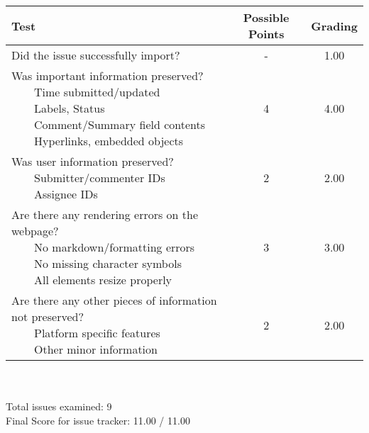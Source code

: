 \documentclass{article}
\newcommand{\tabitem}{~~\llap{\textbullet}~~}
\begin{document}
\begin{adjustbox}{center}
	\renewcommand{\arraystretch}{1.5}
	\begin{tabular}{ p{6cm} | c | c }
		Test & Possible Points & Grading \\ \hline
		Did the issue successfully import? & - & 1.00 \\
		\hline
		\makecell[l]{
			Was important information preserved? \\
			\tabitem Time submitted/updated \\
			\tabitem Labels, Status \\
			\tabitem Comment/Summary field contents \\
			\tabitem Hyperlinks, embedded objects}
		& 4 & 4.00 \\
		\hline
		\makecell[l]{
			Was user information preserved? \\
			\tabitem Submitter/commenter IDs \\
			\tabitem Assignee IDs
		} & 2 & 2.00 \\
		\hline
		\makecell[{{p{6cm}}}]{
			Are there any rendering errors on the webpage? \\
			\tabitem No markdown/formatting errors \\
			\tabitem No missing character symbols \\
			\tabitem All elements resize properly
		} & 3 & 3.00 \\
		\hline
		\makecell[{{p{6cm}}}]{
			Are there any other pieces of information not preserved? \\
			\tabitem Platform specific features \\
			\tabitem Other minor information
		} & 2 & 2.00 \\
	\end{tabular}
\end{adjustbox}
\\
\\Total issues examined: 9\\Final Score for issue tracker: 11.00 / 11.00 \\ \\\begin{adjustbox}{center}
\end{adjustbox}
\end{document}

